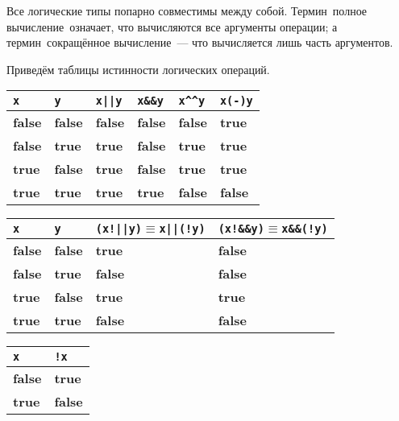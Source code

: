 \documentclass[10pt]{report}
\begin{document}
Все логические типы попарно совместимы между собой. Термин\ \glqq полное вычисление\grqq\ означает, что вычисляются все аргументы операции; а термин\ \glqq сокращённое
вычисление\grqq\ --- что вычисляется лишь часть аргументов.

Приведём таблицы истинности логических операций.
\begin{center}
\vspace{5mm}
\begin{longtable}{|l|l|l|l|l|l|}  \hline
\texttt{x}          & \texttt{y}        & \texttt{x||y}     & \texttt{x\&\&y}   & \texttt{x\^{ }\^{ }y}   & \texttt{x(-)y}\\  \hline
\textbf{false}       & \textbf{false}     & \textbf{false}     & \textbf{false}     & \textbf{false}      & \textbf{true}   \\  \hline
\textbf{false}       & \textbf{true}   & \textbf{true}   & \textbf{false}     & \textbf{true}      & \textbf{true}  \\  \hline
\textbf{true}     & \textbf{false}     & \textbf{true}   & \textbf{false}     & \textbf{true}     & \textbf{true}   \\  \hline
\textbf{true}     & \textbf{true}   & \textbf{true}   & \textbf{true}   & \textbf{false}      & \textbf{false}   \\  \hline
\end{longtable}

\begin{longtable}{|l|l|l|l|}  \hline
\texttt{x}          & \texttt{y}        & \texttt{(x!||y)$\equiv$x||(!y)}   & \texttt{(x!\&\&y)$\equiv$x\&\&(!y)}   \\  \hline
\textbf{false}       & \textbf{false}     & \textbf{true}                   & \textbf{false}                         \\  \hline
\textbf{false}       & \textbf{true}   & \textbf{false}                     & \textbf{false}                         \\  \hline
\textbf{true}     & \textbf{false}     & \textbf{true}                   & \textbf{true}                       \\  \hline
\textbf{true}     & \textbf{true}   & \textbf{false}                     & \textbf{false}                         \\  \hline
\end{longtable}


\begin{longtable}{|l|l|}  \hline
 \texttt{x}         & \texttt{!x}       \\  \hline
\textbf{false}       & \textbf{true}   \\  \hline
\textbf{true}     & \textbf{false}     \\  \hline
\end{longtable}
\end{center}
\end{document}
